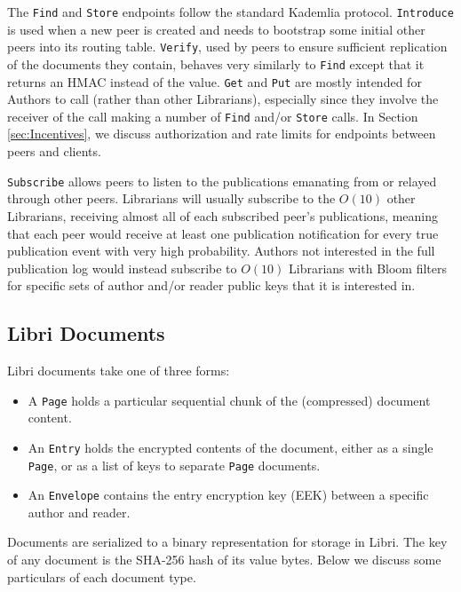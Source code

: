 \documentclass[10pt]{article}
\newcommand{\ttt}[1]{\texttt{#1}}
\def\Entry{\ttt{Entry}}
\def\Page{\ttt{Page}}
\def\Envelope{\ttt{Envelope}}
\def\Put{\ttt{Put}}
\def\Get{\ttt{Get}}
\begin{document}
The \ttt{Find} and \texttt{Store} endpoints follow the standard Kademlia protocol. \texttt{Introduce} is used when a new peer is created and needs to bootstrap some initial other peers into its routing table. \texttt{Verify}, used by peers to ensure sufficient replication of the documents they contain, behaves very similarly to \texttt{Find} except that it returns an HMAC instead of the value. \Get{} and \Put{} are mostly intended for Authors to call (rather than other Librarians), especially since they involve the receiver of the call making a number of \texttt{Find} and/or \texttt{Store} calls. In Section \ref{sec:Incentives}, we discuss authorization and rate limits for endpoints between peers and clients.

\ttt{Subscribe} allows peers to listen to the publications emanating from or relayed through other peers. Librarians will usually subscribe to the $O(10)$ other Librarians, receiving almost all of each subscribed peer's publications, meaning that each peer would receive at least one publication notification for every true publication event with very high probability. Authors not interested in the full publication log would instead subscribe to $O(10)$ Librarians with Bloom filters for specific sets of author and/or reader public keys that it is interested in.

\subsection{Libri Documents}
\label{sec:Docs}
Libri documents take one of three forms:
\begin{itemize}
	\item A \Page{} holds a particular sequential chunk of the (compressed) document content. 
	\item An \Entry{} holds the encrypted contents of the document, either as a single \Page{}, or as a list of keys to separate \Page{} documents.
	\item An \Envelope{} contains the entry encryption key (EEK) between a specific author and reader.
\end{itemize}
Documents are serialized to a binary representation for storage in Libri. The key of any document is the SHA-256 hash of its value bytes. Below we discuss some particulars of each document type.
\end{document}
